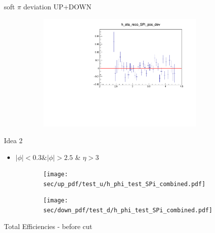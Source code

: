 \documentclass[11pt]{beamer}
\begin{document}
\begin{frame}{soft $\pi$ deviation UP+DOWN}
\begin{figure}
\begin{subfigure}{0.45\textwidth}
\end{subfigure}
\begin{subfigure}{0.45\textwidth}
\includegraphics[width=0.9\textwidth]{first/up_plus_down_pdf/eta_2.pdf}
\end{subfigure}
\end{figure}
\end{frame}
\begin{frame}{Idea 2}
\begin{itemize}
\item $|\phi| < 0.3 \& |\phi| > 2.5$ \& $\eta > 3$
\end{itemize}
\begin{figure}
\begin{subfigure}{0.45\textwidth}
\texttt{[image: sec/up\_pdf/test\_u/h\_phi\_test\_SPi\_combined.pdf]}
\end{subfigure}
\begin{subfigure}{0.45\textwidth}
\texttt{[image: sec/down\_pdf/test\_d/h\_phi\_test\_SPi\_combined.pdf]}
\end{subfigure}
\end{figure}
\end{frame}
\begin{frame}{Total Efficiencies - before cut}
\begin{table}
\end{table}
\end{frame}
\end{document}
